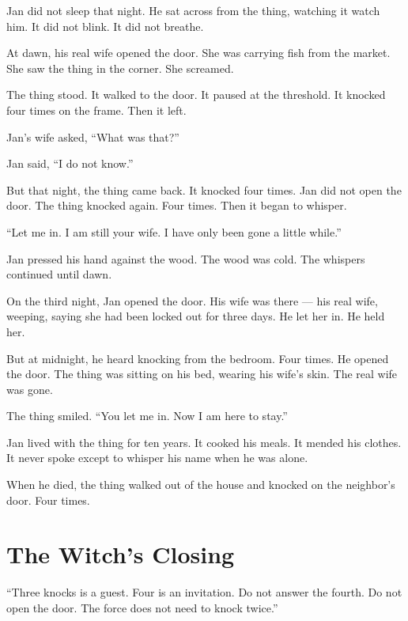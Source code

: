 \documentclass[10pt,twoside]{book}
\begin{document}
Jan did not sleep that night. He sat across from the thing, watching it watch him. It did not blink. It did not breathe.

At dawn, his real wife opened the door. She was carrying fish from the market. She saw the thing in the corner. She screamed.

The thing stood. It walked to the door. It paused at the threshold. It knocked four times on the frame. Then it left.

Jan's wife asked, ``What was that?''

Jan said, ``I do not know.''

But that night, the thing came back. It knocked four times. Jan did not open the door. The thing knocked again. Four times. Then it began to whisper.

``Let me in. I am still your wife. I have only been gone a little while.''

Jan pressed his hand against the wood. The wood was cold. The whispers continued until dawn.

On the third night, Jan opened the door. His wife was there --- his real wife, weeping, saying she had been locked out for three days. He let her in. He held her.

But at midnight, he heard knocking from the bedroom. Four times. He opened the door. The thing was sitting on his bed, wearing his wife's skin. The real wife was gone.

The thing smiled. ``You let me in. Now I am here to stay.''

Jan lived with the thing for ten years. It cooked his meals. It mended his clothes. It never spoke except to whisper his name when he was alone.

When he died, the thing walked out of the house and knocked on the neighbor's door. Four times.

\section*{The Witch's Closing}
``Three knocks is a guest. Four is an invitation. Do not answer the fourth. Do not open the door. The force does not need to knock twice.''
\end{document}

